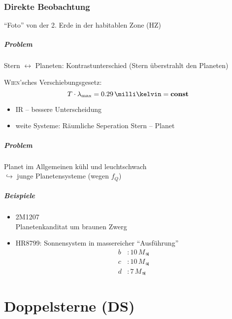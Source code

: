 \subsection{Direkte Beobachtung}
\begin{goal}
    "`Foto"' von der 2. Erde in der habitablen Zone (HZ)
\end{goal}

\paragraph{Problem} Stern $\leftrightarrow$ Planeten: Kontrastunterschied
(Stern überstrahlt den Planeten)


\textsc{Wien}'sches Verschiebungsgesetz:
\[ T \cdot \lambda_{\max} = 0.29\,\milli\kelvin = \textbf{const} \]

\begin{itemize}
    \item IR -- bessere Unterscheidung
    \item weite Systeme: Räumliche Seperation Stern -- Planet
\end{itemize}

\paragraph{Problem} Planet im Allgemeinen kühl und leuchtschwach\\
$\hookrightarrow$ junge Planetensysteme (wegen $f_Q$)

\paragraph{Beispiele}
\begin{itemize}
    \item 2M1207\\
        Planetenkanditat um braunen Zwerg
    \item HR8799: Sonnensystem in massereicher "`Ausführung"'
        \begin{align*}
            b &: 10\,M_{\jupiter} \\
            c &: 10\,M_{\jupiter} \\
            d &: 7\,M_{\jupiter} 
        \end{align*}
\end{itemize}

\chapter[Doppelsterne]{Doppelsterne (DS)}
